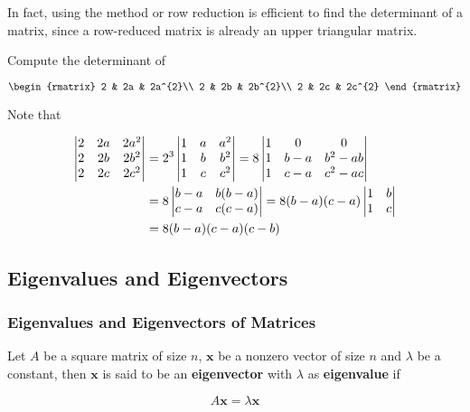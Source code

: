 \documentclass[a4paper,12pt]{article}
\begin{document}
In fact, using the method or row reduction is efficient to find the determinant of a matrix, since a row-reduced matrix is already an upper triangular matrix.\n

\begin{exm}
  Compute the determinant of

  $$\begin{rmatrix}
    2 & 2a & 2a^{2}\\
    2 & 2b & 2b^{2}\\
    2 & 2c & 2c^{2}
  \end{rmatrix}$$\s

  \ans Note that

  $$\begin{aligned}[t]
    \left| \begin{matrix}
      2 & 2a & 2a^{2}\\
      2 & 2b & 2b^{2}\\
      2 & 2c & 2c^{2}
    \end{matrix}\right|&=2^{3}\left| \begin{matrix}
      1 & a & a^{2}\\
      1 & b & b^{2}\\
      1 & c & c^{2}
    \end{matrix}\right|=8\left| \begin{matrix}
      1 & 0 & 0\\
      1 & b-a & b^{2}-ab\\
      1 & c-a & c^{2}-ac
    \end{matrix}\right|\\
    &=8\left| \begin{matrix}
      b-a & b(b-a)\\
      c-a & c(c-a)
    \end{matrix}\right|=8(b-a)(c-a)\left| \begin{matrix}
      1 & b\\
      1 & c
    \end{matrix}\right|\\
    &=8(b-a)(c-a)(c-b)
  \end{aligned}$$
\end{exm}

\subsection{Eigenvalues and Eigenvectors}
\subsubsection{Eigenvalues and Eigenvectors of Matrices}
\begin{dft}
  Let $A$ be a square matrix of size $n$, $\mathbf{x}$ be a nonzero vector of size $n$ and $\lambda$ be a constant, then $\mathbf{x}$ is said to be an \textbf{eigenvector} with $\lambda$ as \textbf{eigenvalue} if

  $$A\mathbf{x}=\lambda\mathbf{x}$$
\end{dft}\n
\end{document}

